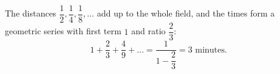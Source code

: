 The distances $\dfrac{1}{2},\dfrac{1}{4},\dfrac{1}{8},\dots$ add up to the whole field, and the times form a geometric series with first term $1$ and ratio $\dfrac{2}{3}$:
\[
1+\dfrac{2}{3}+\dfrac{4}{9}+\dots=\dfrac{1}{1-\dfrac{2}{3}}=\boxed{3}\text{ minutes}.
\]
